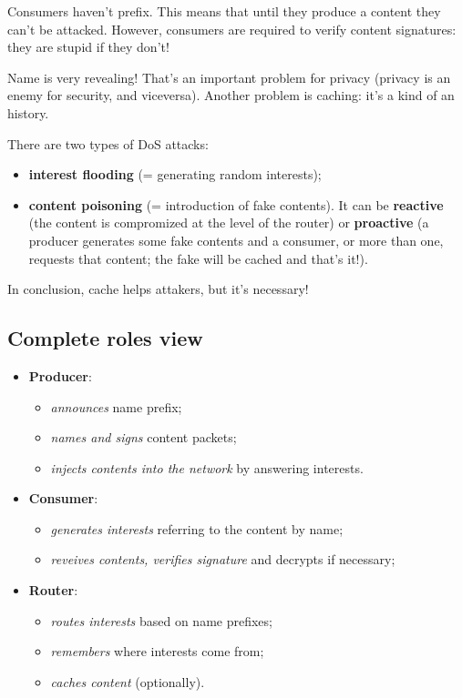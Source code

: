 Consumers haven't prefix. This means that until they produce a content they can't be attacked. However, consumers are required to verify content signatures: they are stupid if they don't!

Name is very revealing! That's an important problem for privacy (privacy is an enemy for security, and viceversa). Another problem is caching: it's a kind of an history.

There are two types of DoS attacks:
\begin{itemize}
  \item \textbf{interest flooding} (= generating random interests);
  \item \textbf{content poisoning} (= introduction of fake contents). It can be \textbf{reactive} (the content is compromized at the level of the router) or \textbf{proactive} (a producer generates some fake contents and a consumer, or more than one, requests that content; the fake will be cached and that's it!).
\end{itemize}
In conclusion, cache helps attakers, but it's necessary!

\subsection{Complete roles view}
\begin{itemize}
  \item \textbf{Producer}:
  \begin{itemize}
    \item \textit{announces} name prefix;
    \item \textit{names and signs} content packets;
    \item \textit{injects contents into the network} by answering interests.
  \end{itemize}
  \item \textbf{Consumer}:
  \begin{itemize}
    \item \textit{generates interests} referring to the content by name;
    \item \textit{reveives contents, verifies signature} and decrypts if necessary;
  \end{itemize}
  \item \textbf{Router}:
  \begin{itemize}
    \item \textit{routes interests} based on name prefixes;
    \item \textit{remembers} where interests come from;
    \item \textit{caches content} (optionally).
  \end{itemize}
\end{itemize}
